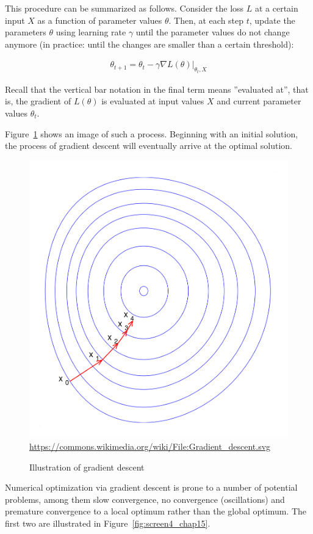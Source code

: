 This procedure can be summarized as follows. Consider the loss $L$ at a certain input $X$ as a function of parameter values $\theta$. Then, at each step $t$, update the parameters $\theta$ using learning rate $\gamma$ until the parameter values do not change anymore (in practice: until the changes are smaller than a certain threshold):

\begin{align}
\theta_{t+1} = \theta_t - \gamma \nabla L(\theta) \rvert_{\theta_t, X} \label{eq:gradientupdate}
\end{align}

Recall that the vertical bar notation in the final term means ''evaluated at'', that is, the gradient of $L(\theta)$ is evaluated at input values $X$ and current parameter values $\theta_t$.

Figure~\ref{fig:gradientdescent} shows an image of such a process. Beginning with an initial solution, the process of gradient descent will eventually arrive at the optimal solution.

\begin{figure}
\centering
\includegraphics[width=.5\textwidth]{gradient_descent.png} \\

\scriptsize \url{https://commons.wikimedia.org/wiki/File:Gradient_descent.svg}
\caption{Illustration of gradient descent}
\label{fig:gradientdescent}
\end{figure}

Numerical optimization via gradient descent is prone to a number of potential problems, among them slow convergence, no convergence (oscillations) and premature convergence to a local optimum rather than the global optimum. The first two are illustrated in Figure~\ref{fig:screen4_chap15}.

